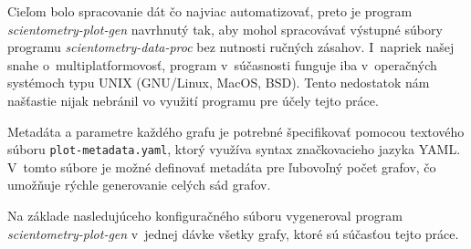 Cieľom bolo spracovanie dát čo najviac automatizovať, preto je program
\emph{scientometry-plot-gen} navrhnutý tak, aby mohol spracovávať výstupné
súbory programu \emph{scientometry-data-proc} bez nutnosti ručných zásahov.
I~napriek našej snahe o~multiplatformovosť, program v~súčasnosti funguje iba
v~operačných systémoch typu UNIX (GNU/Linux, MacOS, BSD). Tento nedostatok nám
našťastie nijak nebránil vo využití programu pre účely tejto práce.

Metadáta a parametre každého grafu je potrebné špecifikovať pomocou textového
súboru \verb|plot-metadata.yaml|, ktorý využíva syntax značkovacieho jazyka
YAML. V~tomto súbore je možné definovať metadáta pre ľubovoľný počet grafov, čo
umožňuje rýchle generovanie celých sád grafov.

Na základe nasledujúceho konfiguračného súboru vygeneroval program
\emph{scientometry-plot-gen} v~jednej dávke všetky grafy, ktoré sú súčasťou
tejto práce.

